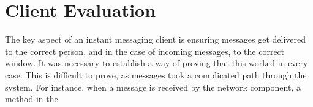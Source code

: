\section{Client Evaluation}
\label{client_eval}

The key aspect of an instant messaging client is ensuring messages get delivered to the correct person, and in the case of incoming messages, to the correct window. It was necessary to establish a way of proving that this worked in every case. This is difficult to prove, as messages took a complicated path through the system. For instance, when a message is received by the network component, a method in the 






